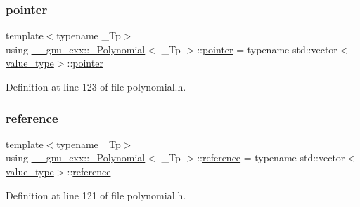 \subsubsection{\texorpdfstring{pointer}{pointer}}
{\footnotesize\ttfamily template$<$typename \+\_\+\+Tp$>$ \\
using \hyperlink{class____gnu__cxx_1_1__Polynomial}{\+\_\+\+\_\+gnu\+\_\+cxx\+::\+\_\+\+Polynomial}$<$ \+\_\+\+Tp $>$\+::\hyperlink{class____gnu__cxx_1_1__Polynomial_a876dcb9c1b92c4896a3f3b9f26e7e3df}{pointer} =  typename std\+::vector$<$\hyperlink{class____gnu__cxx_1_1__Polynomial_a725563351f50e76084a7a016c06f8a53}{value\+\_\+type}$>$\+::\hyperlink{class____gnu__cxx_1_1__Polynomial_a876dcb9c1b92c4896a3f3b9f26e7e3df}{pointer}}



Definition at line 123 of file polynomial.\+h.

\mbox{\label{class____gnu__cxx_1_1__Polynomial_accb3b4df60e4ad82d466173d54ea731a}} 
\subsubsection{\texorpdfstring{reference}{reference}}
{\footnotesize\ttfamily template$<$typename \+\_\+\+Tp$>$ \\
using \hyperlink{class____gnu__cxx_1_1__Polynomial}{\+\_\+\+\_\+gnu\+\_\+cxx\+::\+\_\+\+Polynomial}$<$ \+\_\+\+Tp $>$\+::\hyperlink{class____gnu__cxx_1_1__Polynomial_accb3b4df60e4ad82d466173d54ea731a}{reference} =  typename std\+::vector$<$\hyperlink{class____gnu__cxx_1_1__Polynomial_a725563351f50e76084a7a016c06f8a53}{value\+\_\+type}$>$\+::\hyperlink{class____gnu__cxx_1_1__Polynomial_accb3b4df60e4ad82d466173d54ea731a}{reference}}



Definition at line 121 of file polynomial.\+h.

\mbox{\label{class____gnu__cxx_1_1__Polynomial_aed8f7d97c575d5c34c54170631953415}} 
